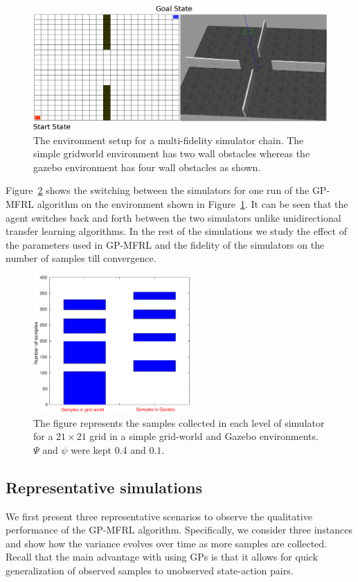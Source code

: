 \documentclass[12pt]{report}
\begin{document}
\begin{figure}[htp]
	\centering
	\includegraphics[width=1\columnwidth]{env.eps}
	\caption{The environment setup for a multi-fidelity simulator chain. The simple gridworld environment has two wall obstacles whereas the gazebo environment has four wall obstacles as shown.}
   \label{fig:gp_mfrl_setup}
\end{figure}

Figure~\ref{fig:epoch_samples} shows the switching between the simulators for one run of the GP-MFRL algorithm on the environment shown in Figure~\ref{fig:gp_mfrl_setup}. It can be seen that the agent switches back and forth between the two simulators unlike unidirectional transfer learning algorithms. In the rest of the simulations we study the effect of the parameters used in GP-MFRL and the fidelity of the simulators on the number of samples till convergence.
\begin{figure}[htp]
	\centering 
    \includegraphics[width=6cm]{epoch.eps}
	\caption{ The figure represents the samples collected in each level of simulator for a $21 \times 21$ grid in a simple grid-world and Gazebo environments. $\Psi$ and $\psi$ were kept 0.4 and $0.1$.}
   \label{fig:epoch_samples}
\end{figure}

\subsection{Representative simulations}
We first present three representative scenarios to observe the qualitative performance of the GP-MFRL algorithm. Specifically, we consider three instances and show how the variance evolves over time as more samples are collected. Recall that the main advantage with using GPs is that it allows for quick generalization of observed samples to unobserved state-action pairs.
\end{document}
